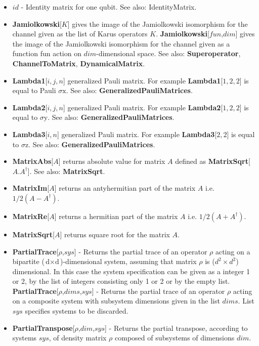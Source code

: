 \begin{itemize}
\item  $id$ - Identity matrix for one qubit. See also: IdentityMatrix.
\item  \textbf{Jamiolkowski}[$K$] gives the image of the Jamiolkowski isomorphism for the channel given as the list of Karus operators $K$. \newline{}
\textbf{Jamiolkowski}[$fun$,$dim$] gives the image of the Jamiolkowski isomorphism for the channel given as a function fun action on $dim$-dimensional space. See also: \textbf{Superoperator}, \textbf{ChannelToMatrix}, \textbf{DynamicalMatrix}.
\item  \textbf{Lambda1}[$i,j,n$] generalized Pauli matrix. For example \textbf{Lambda1}[$1,2,2$] is equal to Pauli $\text{$\sigma $x}$. See also: \textbf{GeneralizedPauliMatrices}.
\item  \textbf{Lambda2}[$i,j,n$] generalized Pauli matrix. For example \textbf{Lambda2}[$1,2,2$] is equal to $\text{$\sigma $y}$. See also: \textbf{GeneralizedPauliMatrices}.
\item  \textbf{Lambda3}[$i,n$] generalized Pauli matrix. For example \textbf{Lambda3}[$2,2$] is equal to $\text{$\sigma $z}$. See also: \textbf{GeneralizedPauliMatrices}.
\item  \textbf{MatrixAbs}[$A$] returns absolute value for matrix $A$ defined as \textbf{MatrixSqrt}[$A.A^{\dagger }$]. See also: \textbf{MatrixSqrt}.
\item  \textbf{MatrixIm}[$A$] returns an antyhermitian part of the matrix $A$ i.e. $1/2(A-A^{\dagger })$.
\item  \textbf{MatrixRe}[$A$] returns a hermitian part of the matrix $A$ i.e. $1/2(A+A^{\dagger })$.
\item  \textbf{MatrixSqrt}[$A$] returns square root for the matrix $A$.
\item  \textbf{PartialTrace}[$\rho$,$sys$] - Returns the partial trace of an operator $\rho$ acting on a bipartite ($\text{d$\times $d}$)-dimensional system, assuming that matrix $\rho$ is ($d^2\times d^2$) dimensional. In this case the system specification can be given as a integer 1 or 2, by the list of integers consisting only 1 or 2 or by the empty list. \newline{}
\textbf{PartialTrace}[$\rho$,$dims$,$sys$] - Returns the partial trace of an operator $\rho$ acting on a composite system with subsystem dimensions given in the list $dims$. List $sys$ specifies systems to be discarded.
\item  \textbf{PartialTranspose}[$\rho$,$dim$,$sys$] - Returns the partial transpose, according to systems $sys$, of density matrix $\rho$ composed of subsystems of dimensions $dim$.

\end{itemize}
